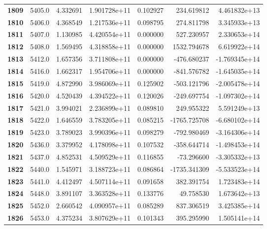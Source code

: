 \documentclass{report}[12pt]
\begin{document}
\begin{center}
\begin{tabular}{lrrrrrr}
\textbf{1809} &         5405.0 &   4.332691 &  1.901728e+11 &    0.102927 &   234.619812 &  4.461832e+13 \\
\textbf{1810} &         5406.0 &   4.368549 &  1.217536e+11 &    0.098795 &   274.811798 &  3.345933e+13 \\
\textbf{1811} &         5407.0 &   1.130985 &  4.420554e+11 &    0.000000 &   527.230957 &  2.330653e+14 \\
\textbf{1812} &         5408.0 &   1.569495 &  4.318858e+11 &    0.000000 &  1532.794678 &  6.619922e+14 \\
\textbf{1813} &         5412.0 &   1.657356 &  3.711808e+11 &    0.000000 &  -476.680237 & -1.769345e+14 \\
\textbf{1814} &         5416.0 &   1.662317 &  1.954706e+11 &    0.000000 &  -841.576782 & -1.645035e+14 \\
\textbf{1815} &         5419.0 &   4.872990 &  3.986069e+11 &    0.125902 &  -503.121796 & -2.005478e+14 \\
\textbf{1816} &         5420.0 &   4.520439 &  4.394522e+11 &    0.120026 &  -249.697754 & -1.097302e+14 \\
\textbf{1817} &         5421.0 &   3.994021 &  2.236899e+11 &    0.089810 &   249.955322 &  5.591249e+13 \\
\textbf{1818} &         5422.0 &   1.646559 &  3.783205e+11 &    0.085215 & -1765.725708 & -6.680102e+14 \\
\textbf{1819} &         5423.0 &   3.789023 &  3.990396e+11 &    0.098279 &  -792.980469 & -3.164306e+14 \\
\textbf{1820} &         5436.0 &   3.379952 &  4.178098e+11 &    0.107532 &  -358.644714 & -1.498453e+14 \\
\textbf{1821} &         5437.0 &   4.852531 &  4.509529e+11 &    0.116855 &   -73.296600 & -3.305332e+13 \\
\textbf{1822} &         5440.0 &   1.545971 &  3.188723e+11 &    0.086864 & -1735.341309 & -5.533523e+14 \\
\textbf{1823} &         5441.0 &   4.412497 &  4.507114e+11 &    0.091658 &   382.391754 &  1.723483e+14 \\
\textbf{1824} &         5448.0 &   3.891107 &  3.363528e+11 &    0.133776 &    49.758530 &  1.673642e+13 \\
\textbf{1825} &         5452.0 &   2.660542 &  4.090957e+11 &    0.085289 &   837.306519 &  3.425385e+14 \\
\textbf{1826} &         5453.0 &   4.375234 &  3.807629e+11 &    0.101343 &   395.295990 &  1.505141e+14 \\

\end{tabular}
\end{center}
\end{document}
